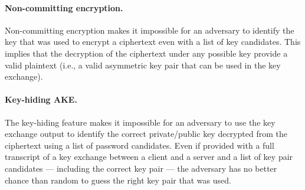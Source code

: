 ﻿\documentclass[../report.tex]{subfiles}
\begin{document}
\paragraph{Non-committing encryption.} \label{sec:non_committing_encryption}
Non-committing encryption makes it impossible for an adversary to identify the key that was used to encrypt a ciphertext even with a list of key candidates. This implies that the decryption of the ciphertext under any possible key provide a valid plaintext (i.e., a valid asymmetric key pair that can be used in the key exchange).


\paragraph{Key-hiding AKE.} \label{sec:key_hiding_ake}
The key-hiding feature makes it impossible for an adversary to use the key exchange output to identify the correct private/public key decrypted from the ciphertext using a list of password candidates.
Even if provided with a full transcript of a key exchange between a client and a server and a list of key pair candidates --- including the correct key pair --- the adversary has no better chance than random to guess the right key pair that was used.


% 
% 


\paragraph{}
\end{document}
